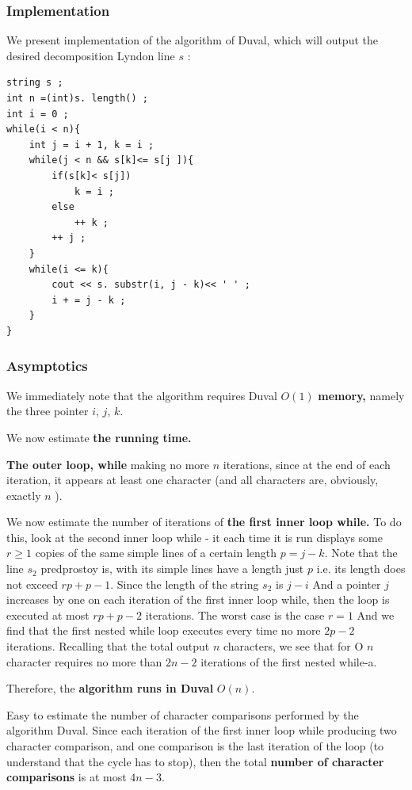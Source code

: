 \subsubsection{ Implementation }

We present implementation of the algorithm of Duval, which will output the desired decomposition Lyndon line $s$ :

\begin{verbatim}
string s ;
int n =(int)s. length() ;
int i = 0 ;
while(i < n){
    int j = i + 1, k = i ;
    while(j < n && s[k]<= s[j ]){
        if(s[k]< s[j])
            k = i ;
        else
            ++ k ;
        ++ j ;
    }
    while(i <= k){
        cout << s. substr(i, j - k)<< ' ' ;
        i + = j - k ;
    }
} 
\end{verbatim}
\subsubsection{ Asymptotics }

We immediately note that the algorithm requires Duval \textbf{$O (1)$} \textbf{memory,} namely the three pointer $i$, $j$, $k$.

We now estimate \textbf{the running time.}

\textbf{The outer loop, while} making no more $n$ iterations, since at the end of each iteration, it appears at least one character (and all characters are, obviously, exactly $n$ ).

We now estimate the number of iterations of \textbf{the first inner loop while.} To do this, look at the second inner loop while - it each time it is run displays some $r \ge 1$ copies of the same simple lines of a certain length $p = j-k$. Note that the line $s_2$ predprostoy is, with its simple lines have a length just $p$ i.e. its length does not exceed $r p + p - 1$. Since the length of the string $s_2$ is $j-i$ And a pointer $j$ increases by one on each iteration of the first inner loop while, then the loop is executed at most $r p + p - 2$ iterations. The worst case is the case $r = 1$ And we find that the first nested while loop executes every time no more $2 p - 2$ iterations. Recalling that the total output $n$ characters, we see that for O $n$ character requires no more than $2 n - 2$ iterations of the first nested while-a.

Therefore, the \textbf{algorithm runs in Duval} \textbf{$O (n)$}.

Easy to estimate the number of character comparisons performed by the algorithm Duval. Since each iteration of the first inner loop while producing two character comparison, and one comparison is the last iteration of the loop (to understand that the cycle has to stop), then the total \textbf{number of character comparisons} is at most $4 n - 3$.

